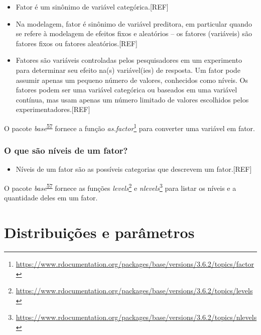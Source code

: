 \documentclass[
  a4paper,
]{book}
\providecommand{\tightlist}{%
  \setlength{\itemsep}{0pt}\setlength{\parskip}{0pt}}
\renewcommand{\href}[2]{#2\footnote{\url{#1}}}
\newenvironment{infobox}[1]
  {
  \begin{itemize}
  \renewcommand{\labelitemi}{
    \raisebox{-.7\height}[0pt][0pt]{
      {\setkeys{Gin}{width=3em,keepaspectratio}
        \texttt{[image: \#1]}}
    }
  }
  \setlength{\fboxsep}{1em}
  \begin{blackbox}
  \item
  }
  {
  \end{blackbox}
  \end{itemize}
  }
\begin{document}
\begin{itemize}
\item
  Fator é um sinônimo de variável categórica.{[}REF{]}
\item
  Na modelagem, fator é sinônimo de variável preditora, em particular quando se refere à modelagem de efeitos fixos e aleatórios -- os fatores (variáveis) são fatores fixos ou fatores aleatórios.{[}REF{]}
\item
  Fatores são variáveis controladas pelos pesquisadores em um experimento para determinar seu efeito na(s) variável(ies) de resposta. Um fator pode assumir apenas um pequeno número de valores, conhecidos como níveis. Os fatores podem ser uma variável categórica ou baseados em uma variável contínua, mas usam apenas um número limitado de valores escolhidos pelos experimentadores.{[}REF{]}
\end{itemize}

\begin{infobox}{images/Rlogo}
O pacote \emph{base}\textsuperscript{\protect\hyperlink{ref-base-2}{57}} fornece a função \href{https://www.rdocumentation.org/packages/base/versions/3.6.2/topics/factor}{\emph{as.factor}} para converter uma variável em fator.

\end{infobox}

\hypertarget{o-que-suxe3o-nuxedveis-de-um-fator}{%
\subsection{O que são níveis de um fator?}\label{o-que-suxe3o-nuxedveis-de-um-fator}}

\begin{itemize}
\tightlist
\item
  Níveis de um fator são as possíveis categorias que descrevem um fator.{[}REF{]}
\end{itemize}

\begin{infobox}{images/Rlogo}
O pacote \emph{base}\textsuperscript{\protect\hyperlink{ref-base-2}{57}} fornece as funções \href{https://www.rdocumentation.org/packages/base/versions/3.6.2/topics/levels}{\emph{levels}} e \href{https://www.rdocumentation.org/packages/base/versions/3.6.2/topics/nlevels}{\emph{nlevels}} para listar os níveis e a quantidade deles em um fator.

\end{infobox}

\hypertarget{distribuicoes-parametros}{%
\chapter{\texorpdfstring{\textbf{Distribuições e parâmetros}}{Distribuições e parâmetros}}\label{distribuicoes-parametros}}
\end{document}
